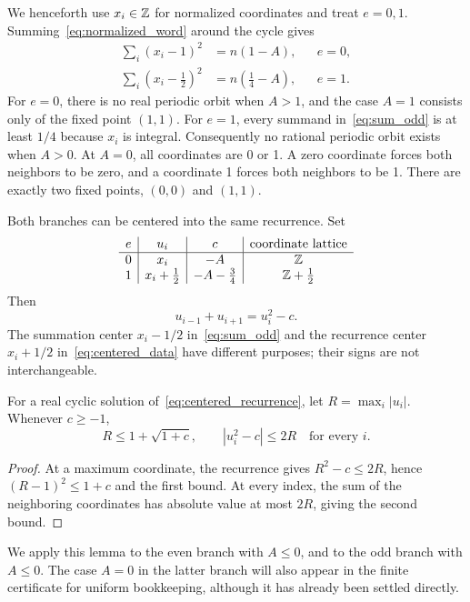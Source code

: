 We henceforth use \(x_i\in\mathbb{Z}\) for normalized coordinates and treat
\(e=0,1\). Summing~\eqref{eq:normalized_word} around the cycle gives
\begin{align}
 \sum_i(x_i-1)^2&=n(1-A), && e=0, \label{eq:sum_even}\\
 \sum_i(x_i-\tfrac12)^2&=n(\tfrac14-A), && e=1.
 \label{eq:sum_odd}
\end{align}
For \(e=0\), there is no real periodic orbit when \(A>1\), and the
case \(A=1\) consists only of the fixed point \((1,1)\). For
\(e=1\), every summand in~\eqref{eq:sum_odd} is at least \(1/4\)
because \(x_i\) is integral. Consequently no rational periodic orbit
exists when \(A>0\). At \(A=0\), all coordinates are 0 or 1. A zero
coordinate forces both neighbors to be zero, and a coordinate 1 forces
both neighbors to be 1. There are exactly two fixed points,
\((0,0)\) and \((1,1)\).

Both branches can be centered into the same recurrence. Set
\begin{equation}
 \begin{array}{c|c|c|c}
 e & u_i & c & \text{coordinate lattice}\\ \hline
 0 & x_i & -A & \mathbb{Z}\\
 1 & x_i+\tfrac12 & -A-\tfrac34 & \mathbb{Z}+\tfrac12
 \end{array}
 \label{eq:centered_data}
\end{equation}
Then
\begin{equation}
 u_{i-1}+u_{i+1}=u_i^2-c.
 \label{eq:centered_recurrence}
\end{equation}
The summation center \(x_i-1/2\) in~\eqref{eq:sum_odd} and the
recurrence center \(x_i+1/2\) in~\eqref{eq:centered_data} have different
purposes; their signs are not interchangeable.

\begin{lemma}
\label{lem:real_bounds}
For a real cyclic solution of~\eqref{eq:centered_recurrence}, let
\(R=\max_i|u_i|\). Whenever \(c\ge-1\),
\begin{equation}
 R\le1+\sqrt{1+c},\qquad |u_i^2-c|\le2R\quad\text{for every }i.
 \label{eq:real_bounds}
\end{equation}
\end{lemma}
\begin{proof}
At a maximum coordinate, the recurrence gives
\(R^2-c\le2R\), hence \((R-1)^2\le1+c\) and the first bound.
At every index, the sum of the neighboring coordinates has absolute
value at most \(2R\), giving the second bound.
\end{proof}

We apply this lemma to the even branch with \(A\le0\), and to the odd
branch with \(A\le0\). The case \(A=0\) in the latter branch will
also appear in the finite certificate for uniform bookkeeping, although
it has already been settled directly.
